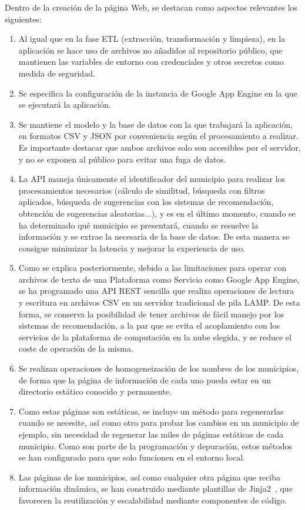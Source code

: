Dentro de la creación de la página Web, se destacan como aspectos relevantes los siguientes:

\begin{enumerate}
    \item Al igual que en la fase ETL (extracción, transformación y limpieza), en la aplicación se hace uso de archivos no añadidos al repositorio público, que mantienen las variables de entorno con credenciales y otros secretos como medida de seguridad.
    \item Se especifica la configuración de la instancia de Google App Engine en la que se ejecutará la aplicación.
    \item Se mantiene el modelo y la base de datos con la que trabajará la aplicación, en formatos CSV y JSON por conveniencia según el procesamiento a realizar. Es importante destacar que ambos archivos solo son accesibles por el servidor, y no se exponen al público para evitar una fuga de datos.
    \item La API maneja únicamente el identificador del municipio para realizar los procesamientos necesarios (cálculo de similitud, búsqueda con filtros aplicados, búsqueda de sugerencias con los sistemas de recomendación, obtención de sugerencias aleatorias...), y es en el último momento, cuando se ha determinado qué municipio se presentará, cuando se resuelve la información y se extrae la necesaria de la base de datos. De esta manera se consigue minimizar la latencia y mejorar la experiencia de uso.
    \item Como se explica posteriormente, debido a las limitaciones para operar con archivos de texto de una Plataforma como Servicio como Google App Engine, se ha programado una API REST sencilla que realiza operaciones de lectura y escritura en archivos CSV en un servidor tradicional de pila LAMP. De esta forma, se conserva la posibilidad de tener archivos de fácil manejo por los sistemas de recomendación, a la par que se evita el acoplamiento con los servicios de la plataforma de computación en la nube elegida, y se reduce el coste de operación de la misma.
    \item Se realizan operaciones de homogeneización de los nombres de los municipios, de forma que la página de información de cada uno pueda estar en un directorio estático conocido y permanente.
    \item Como estas páginas son estáticas, se incluye un método para regenerarlas cuando se necesite, así como otro para probar los cambios en un municipio de ejemplo, sin necesidad de regenerar las miles de páginas estáticas de cada municipio. Como son parte de la programación y depuración, estos métodos se han configurado para que solo funcionen en el entorno local.
    \item Las páginas de los municipios, así como cualquier otra página que reciba información dinámica, se han construido mediante plantillas de Jinja2~\cite{jinja2}, que favorecen la reutilización y escalabilidad mediante componentes de código.
    
\end{enumerate}

